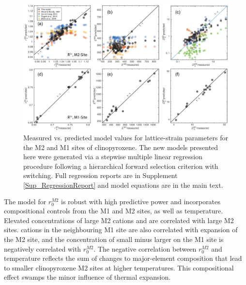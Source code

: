\documentclass[final,authoryear,3p,times,twocolumn]{elsarticle}
\begin{document}
	   
        \begin{figure}
        \begin{center}
        \includegraphics[width=1\textwidth]{12_StepwiseMultilinear_M1M2_24Oct2017.eps}
        \caption[Measured vs. predicted model values for lattice-strain parameters for the M2 and M1 sites of clinopyroxene]{Measured vs. predicted model values for lattice-strain parameters for the M2 and M1 sites of clinopyroxene. The new models presented here were generated via a stepwise multiple linear regression procedure following a hierarchical forward selection criterion with switching. Full regression reports are in Supplement \ref{Sup_RegressionReport} and model equations are in the main text.
        }
        \label{12_MLModel}
        \end{center}
        \end{figure}

	   

The model for $r_0^{M2}$ is robust with high predictive power and incorporates compositional controls from the M1 and M2 sites, as well as temperature. Elevated concentrations of large M2 cations  and  are correlated with large M2 sites.  cations in the neighbouring M1 site are also correlated with expansion of the M2 site, and the concentration of small  minus larger  on the M1 site is negatively correlated with $r_0^{M2}$. The negative correlation between $r_0^{M2}$ and temperature reflects the sum of changes to major-element composition that lead to smaller clinopyroxene M2 sites at higher temperatures. This compositional effect swamps the minor influence of thermal expansion.
\end{document}
